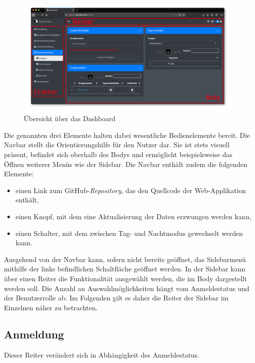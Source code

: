 \documentclass[
]{article}
\providecommand{\tightlist}{%
  \setlength{\itemsep}{0pt}\setlength{\parskip}{0pt}}
\begin{document}
\begin{figure}
\centering
\includegraphics{./img/app_overview.png}
\caption{\label{fig:app-overview}Übersicht über das Dashboard}
\end{figure}

Die genannten drei Elemente halten dabei wesentliche Bedienelemente bereit. Die Navbar stellt die Orientierungshilfe für den Nutzer dar. Sie ist stets visuell präsent, befindet sich oberhalb des Bodys und ermöglicht beispielsweise das Öffnen weiterer Menüs wie der Sidebar. Die Navbar enthält zudem die folgenden Elemente:

\begin{itemize}
\tightlist
\item
  einen Link zum GitHub-\emph{Repository}, das den Quellcode der Web-Applikation enthält,
\item
  einen Knopf, mit dem eine Aktualisierung der Daten erzwungen werden kann,
\item
  einen Schalter, mit dem zwischen Tag- und Nachtmodus gewechselt werden kann.
\end{itemize}

Ausgehend von der Navbar kann, sofern nicht bereits geöffnet, das Sidebarmenü mithilfe der links befindlichen Schaltfläche geöffnet werden. In der Sidebar kann über einen Reiter die Funktionalität ausgewählt werden, die im Body dargestellt werden soll. Die Anzahl an Auswahlmöglichkeiten hängt vom Anmeldestatus und der Benutzerrolle ab. Im Folgenden gilt es daher die Reiter der Sidebar im Einzelnen näher zu betrachten.

\hypertarget{login}{%
\subsection{Anmeldung}\label{login}}

Dieser Reiter verändert sich in Abhängigkeit des Anmeldestatus.
\end{document}
